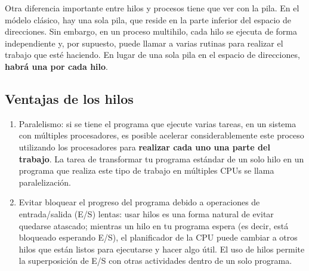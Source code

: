 \documentclass[openany]{book}
\begin{document}
Otra diferencia importante entre hilos y procesos tiene que ver con la pila. En el módelo clásico, hay una sola pila, que reside en la parte inferior del espacio de direcciones. Sin embargo, en un proceso multihilo, \colorbox{blue!20}{cada hilo se ejecuta de forma independiente} y, por supuesto, puede llamar a varias rutinas para realizar el trabajo que esté haciendo. En lugar de una sola pila en el espacio de direcciones, \textbf{habrá una por cada hilo}.

\subsection{Ventajas de los hilos}
\begin{enumerate}
    \item \colorbox{blue!20}{Paralelismo:} si se tiene el programa que ejecute varias tareas, en un sistema con múltiples procesadores, es posible acelerar considerablemente este proceso utilizando los procesadores para \textbf{realizar cada uno una parte del trabajo}. La tarea de transformar tu programa estándar de un solo hilo en un programa que realiza este tipo de trabajo en múltiples CPUs se llama \colorbox{blue!20}{paralelización}.
    \item \colorbox{blue!20}{Evitar bloquear el progreso del programa debido a operaciones de entrada/salida (E/S) lentas}: usar hilos es una forma natural de evitar quedarse atascado; mientras un hilo en tu programa espera (es decir, está bloqueado esperando E/S), el planificador de la CPU puede cambiar a otros hilos que están listos para ejecutarse y hacer algo útil. El uso de hilos permite la superposición de E/S con otras actividades dentro de un solo programa.
\end{enumerate}
\end{document}
